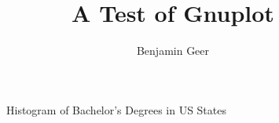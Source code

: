 \documentclass[a4paper]{article}
\title{A Test of Gnuplot}
\author{Benjamin Geer}
\begin{document}
\maketitle

\begin{figure}[h]
\begin{center}

\caption{Histogram of Bachelor's Degrees in US States}
\end{center}
\label{fig:degree}
\end{figure}
\end{document}
